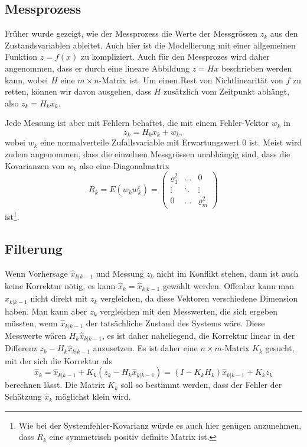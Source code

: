 \subsection{Messprozess\label{subsection:messprozess}}
Früher wurde gezeigt, wie der Messprozess die Werte der Messgrössen $z_k$
aus den Zustandsvariablen ableitet.
Auch hier ist die Modellierung mit einer allgemeinen Funktion $z=f(x)$ 
zu kompliziert.
Auch für den Messprozes wird daher angenommen, dass er durch eine
lineare Abbildung $z=Hx$ beschrieben werden kann, wobei $H$ eine
$m\times n$-Matrix ist.
Um einen Rest von Nichtlinearität von $f$ zu retten, können wir davon
ausgehen, dass $H$ zusätzlich vom Zeitpunkt abhängt, also $z_k=H_kx_k$.

Jede Messung ist aber mit Fehlern behaftet, die mit einem Fehler-Vektor
$w_k$ in
\begin{equation}
z_k = H_kx_k + w_k,
\label{skript:kalman:messfehler}
\end{equation}
wobei $w_k$ eine normalverteile Zufallsvariable mit Erwartungswert $0$
ist.
Meist wird zudem angenommen, dass die einzelnen Messgrössen unabhängig
sind, dass die Kovarianzen von $w_k$ also eine
Diagonalmatrix
\[
R_k = E(w_kw_k^t) =
\begin{pmatrix}
\varrho_1^2&\dots & 0\\
\vdots     &\ddots&\vdots\\
0          &\dots &\varrho_m^2
\end{pmatrix}
\]
ist\footnote{Wie bei der Systemfehler-Kovarianz würde es auch hier
genügen anzunehmen, dass $R_k$ eine symmetrisch positiv definite Matrix
ist.}.

\subsection{Filterung\label{subsection:filterung}}
Wenn Vorhersage $\hat{x}_{k|k-1}$ und Messung $z_k$ nicht im Konflikt
stehen, dann ist auch keine Korrektur nötig, es kann
$\hat{x}_k = \hat{x}_{k|k-1}$ gewählt werden.
Offenbar kann man $\hat{x}_{k|k-1}$ nicht direkt mit $z_k$ vergleichen,
da diese Vektoren verschiedene Dimension haben.
Man kann aber $z_k$ vergleichen mit den Messwerten, die sich ergeben
müssten, wenn $\hat{x}_{k|k-1}$ der tatsächliche Zustand des Systems
wäre.
Diese Messwerte wären $H_k\hat{x}_{k|k-1}$, es ist daher naheliegend,
die Korrektur linear in der Differenz $z_k-H_k\hat{x}_{k|k-1}$
anzusetzen.
Es ist daher eine $n\times m$-Matrix $K_k$ gesucht, mit der sich
die Korrektur als
\begin{equation}
\hat{x}_{k}
=
\hat{x}_{k|k-1} + K_k(z_k-H_k\hat{x}_{k|k-1})
=
(I-K_kH_k)\hat{x}_{k|k-1} + K_kz_k
\label{skript:kalman:filter}
\end{equation}
berechnen lässt.
Die Matrix $K_k$ soll so bestimmt werden, dass der Fehler der
Schätzung $\hat{x}_k$ möglichst klein wird.

